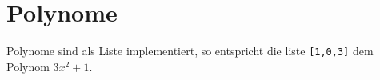 \section{Polynome}
Polynome sind als Liste implementiert, so entspricht die liste \texttt{[1,0,3]}
dem Polynom $3x^2+1$.

